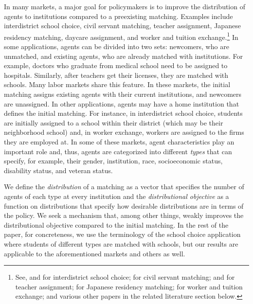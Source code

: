 \documentclass[12pt]{amsart}
\theoremstyle{remark}
\begin{document}
In many markets, a major goal for policymakers is to improve the distribution of agents to institutions compared to a preexisting matching.
Examples include interdistrict school choice, civil servant matching, teacher assignment, Japanese residency matching, daycare assignment,
and worker and tuition exchange.\footnote{See, \cite{hafalir2022interdistrict} and \cite{kamada2022ekkyo} for
interdistrict school choice; \cite{thakur2021matching} for civil servant matching; \cite{durkes18} and \cite{combe2016design,combe2022market} for teacher
assignment; \cite{kamakoji-basic} for Japanese residency matching; \cite{dur2015two} for worker and tuition exchange; and various other papers in the related literature
section below.} In some applications, agents can be divided
into two sets: newcomers, who are unmatched, and existing agents, who are already matched with institutions. For example, doctors who graduate from medical school
need to be assigned to hospitals. %
Similarly, after teachers get their licenses, they are matched with schools. Many labor markets
share this feature. %
In these markets, the initial matching assigns existing agents with their current institutions, and newcomers are unassigned.
In other applications, agents may have a home institution that defines the initial matching.
For instance, in interdistrict school choice, students are
initially assigned to a school within their district (which may be their neighborhood school) and, in worker exchange, workers are assigned to
the firms they are employed at.
In some of these markets, agent characteristics play an important role and, thus, agents are categorized into different \emph{types}
that can specify, for example, their gender, institution, race, socioeconomic status, disability status, and veteran status.

We define the \emph{distribution} of a matching as a vector that specifies the number of agents of each type at every
institution and the \emph{distributional objective} as a function on distributions that specify how desirable
distributions are in terms of the policy. We seek a mechanism that, among other things, weakly improves the distributional objective
compared to the initial matching. In the rest of the paper, for concreteness, we use the terminology of the
school choice application where students of different types are matched with schools, but our results are applicable
to the aforementioned markets and others as well.
\end{document}
